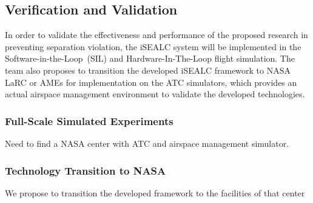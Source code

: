\documentclass[letter,onecolumn,12pt]{aiaa-tc}
\newcommand{\1}{1_n}
\begin{document}
\subsection{Verification and Validation}

In order to validate the effectiveness and performance of the proposed research in preventing separation violation, the iSEALC system will be implemented in the Software-in-the-Loop~(SIL) and Hardware-In-The-Loop flight simulation. The team also proposes to transition the developed iSEALC framework to NASA LaRC or AMEs for implementation on the ATC simulators, which provides an actual airspace management environment to validate the developed technologies.


\subsubsection{Full-Scale Simulated Experiments}

Need to find a NASA center with ATC and airspace management simulator.

\subsubsection{Technology Transition to NASA}

We propose to transition the developed framework to the facilities of that center




\end{document}
